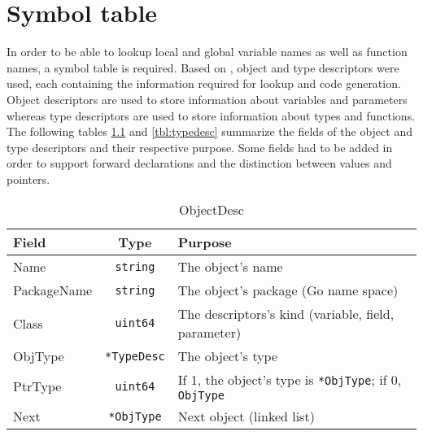 \documentclass[a4paper]{scrreprt}
\begin{document}
  \chapter{Symbol table}
    In order to be able to lookup local and global variable names as well as function names, a symbol table is required. Based on \cite{wir96}, object and type descriptors were used, each containing the information required for lookup and code generation. Object descriptors are used to store information about variables and parameters whereas type descriptors are used to store information about types and functions.\\
    The following tables \ref{tbl:objectdesc} and \ref{tbl:typedesc} summarize the fields of the object and type descriptors and their respective purpose. Some fields had to be added in order to support forward declarations and the distinction between values and pointers.
      \begin{table}[htb]
      \centering
      \begin{tabular}{lcl}
        \toprule
        \textbf{Field} & \textbf{Type} & \textbf{Purpose}\\ 
        \midrule
        Name & \texttt{string} & The object's name\\
        PackageName & \texttt{string} & The object's package (Go name space)\\
        Class & \texttt{uint64} & The descriptors's kind (variable, field, parameter)\\
        ObjType & \texttt{*TypeDesc} & The object's type\\
        PtrType & \texttt{uint64} & If 1, the object's type is \texttt{*ObjType}; if 0, \texttt{ObjType}\\
        Next & \texttt{*ObjType} & Next object (linked list)\\
        \bottomrule
      \end{tabular}
      \caption{ObjectDesc}
      \label{tbl:objectdesc}
      \end{table}
\end{document}
